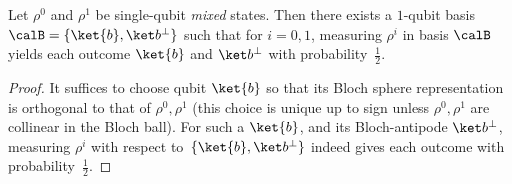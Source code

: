 %
%


\begin{lemma}\label{lem:perpy}
    Let $\rho^0$ and $\rho^1$ be single-qubit \emph{mixed} states. Then there exists a $1$-qubit basis $\calB = \{\ket{b}, \ketbb\}$ such that for $i = 0, 1$, measuring $\rho^i$ in basis $\calB$ yields each outcome $\ket{b}$ and $\ketbb$ with probability~$\frac12$.
\end{lemma}
\begin{proof}
     It suffices to choose qubit $\ket{b}$ so that its Bloch sphere representation is orthogonal to that of $\rho^0, \rho^1$ (this choice is unique up to sign unless $\rho^0, \rho^1$ are collinear in the Bloch ball).  For such a $\ket{b}$, and its Bloch-antipode $\ketbb$, 
     measuring $\rho^i$ with respect to~$\{\ket{b}, \ketbb\}$ indeed gives each outcome with probability~$\frac12$.
\end{proof}

